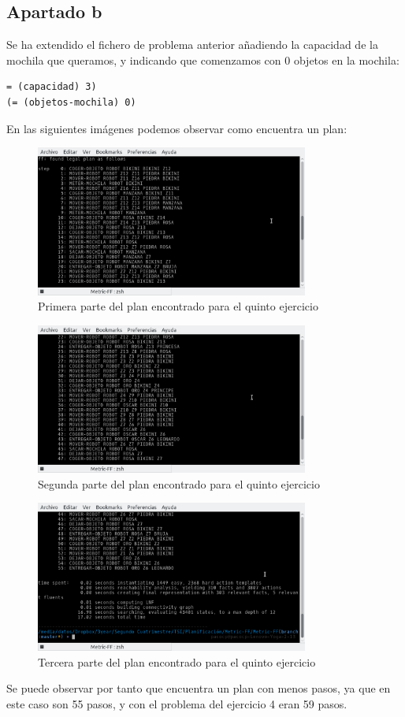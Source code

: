\subsection{Apartado b}
Se ha extendido el fichero de problema anterior añadiendo la capacidad de la mochila que queramos, y indicando que comenzamos con 0 objetos en la mochila:
\begin{verbatim}
= (capacidad) 3)
(= (objetos-mochila) 0)
\end{verbatim}
En las siguientes imágenes podemos observar como encuentra un plan:
\begin{figure}[H]
	\centering
	\includegraphics[width=0.8\textwidth]{img11}
	\caption{Primera parte del plan encontrado para el quinto ejercicio}
\end{figure}
\begin{figure}[H]
	\centering
	\includegraphics[width=0.8\textwidth]{img12}
	\caption{Segunda parte del plan encontrado para el quinto ejercicio}
\end{figure}
\begin{figure}[H]
	\centering
	\includegraphics[width=0.8\textwidth]{img13}
	\caption{Tercera parte del plan encontrado para el quinto ejercicio}
\end{figure}
Se puede observar por tanto que encuentra un plan con menos pasos, ya que en este caso son 55 pasos, y con el problema del ejercicio 4 eran 59 pasos.
